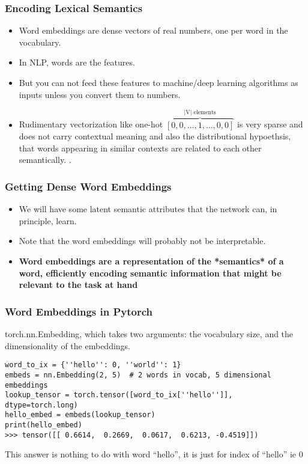 \begin{frame}[fragile]
\frametitle{Encoding Lexical Semantics}

\begin{itemize}
\item Word embeddings are dense vectors of real numbers, one per word in the vocabulary. 
\item In NLP, words are the features.
\item But you can not feed these features to machine/deep learning algorithms as inputs unless you convert them to numbers.
\item Rudimentary vectorization like one-hot $\overbrace{\left[ 0, 0, \dots, 1, \dots, 0, 0 \right]}^\text{|V| elements}$  is very sparse and does not carry contextual meaning and also the distributional hypoethsis, that words appearing in similar contexts are related to each other semantically. .
\end{itemize}
         
\end{frame} 


\begin{frame}[fragile]
\frametitle{Getting Dense Word Embeddings}

\begin{itemize}
\item  We will have some latent semantic attributes that the network can, in principle, learn. 
\item Note that the word embeddings will probably not be interpretable.
\item \textbf{Word embeddings are a representation of the *semantics* of a word, efficiently encoding semantic information that might be relevant to the task at hand}
\end{itemize}
         
\end{frame} 

\begin{frame}[fragile]
\frametitle{Word Embeddings in Pytorch}
torch.nn.Embedding, which takes two arguments: the vocabulary size, and the dimensionality of the embeddings.
 \begin{lstlisting}
word_to_ix = {''hello'': 0, ''world'': 1}
embeds = nn.Embedding(2, 5)  # 2 words in vocab, 5 dimensional embeddings
lookup_tensor = torch.tensor([word_to_ix[''hello'']], dtype=torch.long)
hello_embed = embeds(lookup_tensor)
print(hello_embed)         
>>> tensor([[ 0.6614,  0.2669,  0.0617,  0.6213, -0.4519]])
\end{lstlisting}  
This answer is nothing to do with word ``hello'', it is just for index of ``hello'' ie 0
\end{frame}
 
